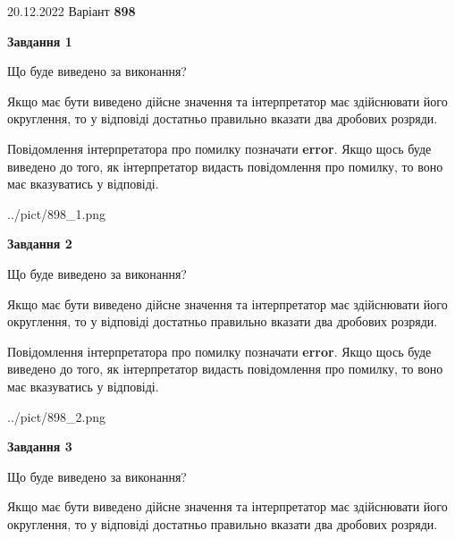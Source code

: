 \documentclass[12pt, ukrainian]{article}
\begin{document}
{20.12.2022 Варіант \No \textbf { 898 }\par}
{
\begin {Large}

{\begin {center}\textbf{Завдання 1}\end {center}}\par
Що буде виведено за виконання? \par

Якщо має бути виведено дійсне значення та інтерпретатор має здійснювати його округлення, 
то у відповіді достатньо правильно вказати два дробових розряди.

Повідомлення інтерпретатора про помилку позначати \textbf{error}.
Якщо щось буде виведено до того, як інтерпретатор видасть повідомлення про помилку, 
то воно має вказуватись у відповіді. \par

\begin{center}
	{../pict/898_1.png}
\end{center}
\newpage

{\begin {center}\textbf{Завдання 2}\end {center}}\par
Що буде виведено за виконання? \par

Якщо має бути виведено дійсне значення та інтерпретатор має здійснювати його округлення, 
то у відповіді достатньо правильно вказати два дробових розряди.

Повідомлення інтерпретатора про помилку позначати \textbf{error}.
Якщо щось буде виведено до того, як інтерпретатор видасть повідомлення про помилку, 
то воно має вказуватись у відповіді. \par

\begin{center}
	{../pict/898_2.png}
\end{center}
\newpage

{\begin {center}\textbf{Завдання 3}\end {center}}\par
Що буде виведено за виконання? \par

Якщо має бути виведено дійсне значення та інтерпретатор має здійснювати його округлення, 
то у відповіді достатньо правильно вказати два дробових розряди.


\end{Large}}
\end{document}
